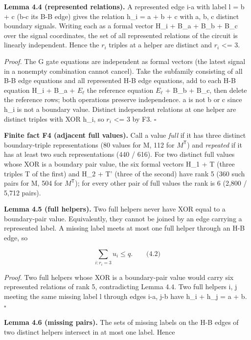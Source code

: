 \textbf{Lemma 4.4 (represented relations).} A represented edge i-a with label l = b + c (b-c its B-B edge) gives the relation h\_i = a + b + c with a, b, c distinct boundary signals. Writing each as a formal vector H\_i + B\_a + B\_b + B\_c over the signal coordinates, the set of all represented relations of the circuit is linearly independent. Hence the \(r_i\) triples at a helper are distinct and \(r_i\) \textless= 3.

\emph{Proof.} The G gate equations are independent as formal vectors (the latest signal in a nonempty combination cannot cancel). Take the subfamily consisting of all B-B edge equations and all represented H-B edge equations, add to each H-B equation H\_i + B\_a + \(E_\ell\) the reference equation \(E_\ell\) + B\_b + B\_c, then delete the reference rows; both operations preserve independence. a is not b or c since h\_i is not a boundary value. Distinct independent relations at one helper are distinct triples with XOR h\_i, so \(r_i\) \textless= 3 by F3. \(\square\)

\textbf{Finite fact F4 (adjacent full values).} Call a value \emph{full} if it has three distinct boundary-triple representations (80 values for M, 112 for \(M^{\mathsf T}\)) and \emph{repeated} if it has at least two such representations (440 / 616). For two distinct full values whose XOR is a boundary pair value, the six formal vectors H\_1 + T (three triples T of the first) and H\_2 + T' (three of the second) have rank 5 (360 such pairs for M, 504 for \(M^{\mathsf T}\)); for every other pair of full values the rank is 6 (2,800 / 5,712 pairs).

\textbf{Lemma 4.5 (full helpers).} Two full helpers never have XOR equal to a boundary-pair value. Equivalently, they cannot be joined by an edge carrying a represented label. A missing label meets at most one full helper through an H-B edge, so

\[
\sum_{i:r_i=3}u_i\le q.\qquad\text{(4.2)}
\]

\emph{Proof.} Two full helpers whose XOR is a boundary-pair value would carry six represented relations of rank 5, contradicting Lemma 4.4. Two full helpers i, j meeting the same missing label l through edges i-a, j-b have h\_i + h\_j = a + b. \(\square\)

\textbf{Lemma 4.6 (missing pairs).} The sets of missing labels on the H-B edges of two distinct helpers intersect in at most one label. Hence

